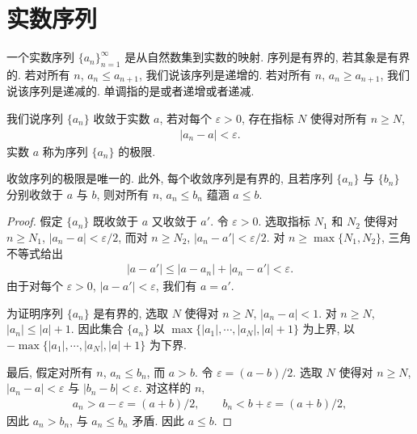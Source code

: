 \documentclass[../../main.tex]{subfiles}
\begin{document}
\section{实数序列}\label{section:ch01-实数序列}

一个实数序列 $\{a_{n}\}_{n=1}^{\infty}$ 是从自然数集到实数的映射. 序列是有界的, 若其象是有界的. 若对所有 $n$, $a_{n}\leqslant a_{n+1}$, 我们说该序列是递增的. 若对所有 $n$, $a_{n}\geqslant a_{n+1}$, 我们说该序列是递减的. 单调指的是或者递增或者递减.

\begin{definition}[收敛]\label{definition:ch01-收敛}
我们说序列 $\{a_{n}\}$ 收敛于实数 $a$, 若对每个 $\varepsilon>0$, 存在指标 $N$ 使得对所有 $n\geqslant N$,
\begin{align*}
|a_{n}-a|<\varepsilon.
\end{align*}
实数 $a$ 称为序列 $\{a_{n}\}$ 的极限.
\end{definition}

\begin{proposition}\label{proposition:ch01-极限性质}
收敛序列的极限是唯一的. 此外, 每个收敛序列是有界的, 且若序列 $\{a_{n}\}$ 与 $\{b_{n}\}$ 分别收敛于 $a$ 与 $b$, 则对所有 $n$, $a_{n}\leqslant b_{n}$ 蕴涵 $a\leqslant b$.
\end{proposition}

\begin{proof}
假定 $\{a_{n}\}$ 既收敛于 $a$ 又收敛于 $a'$. 令 $\varepsilon>0$. 选取指标 $N_{1}$ 和 $N_{2}$ 使得对 $n\geqslant N_{1}$, $|a_{n}-a|<\varepsilon/2$, 而对 $n\geqslant N_{2}$, $|a_{n}-a'|<\varepsilon/2$. 对 $n\geqslant\max\{N_{1},N_{2}\}$, 三角不等式给出
\begin{align*}
|a-a'|\leqslant|a-a_{n}|+|a_{n}-a'|<\varepsilon.
\end{align*}
由于对每个 $\varepsilon>0$, $|a-a'|<\varepsilon$, 我们有 $a=a'$.

为证明序列 $\{a_{n}\}$ 是有界的, 选取 $N$ 使得对 $n\geqslant N$, $|a_{n}-a|<1$. 对 $n\geqslant N$, $|a_{n}|\leqslant|a|+1$. 因此集合 $\{a_{n}\}$ 以 $\max\{|a_{1}|,\cdots,|a_{N}|,|a|+1\}$ 为上界, 以 $-\max\{|a_{1}|,\cdots,|a_{N}|,|a|+1\}$ 为下界.

最后, 假定对所有 $n$, $a_{n}\leqslant b_{n}$, 而 $a>b$. 令 $\varepsilon=(a-b)/2$. 选取 $N$ 使得对 $n\geqslant N$, $|a_{n}-a|<\varepsilon$ 与 $|b_{n}-b|<\varepsilon$. 对这样的 $n$,
\begin{align*}
a_{n}>a-\varepsilon=(a+b)/2,\qquad b_{n}<b+\varepsilon=(a+b)/2,
\end{align*}
因此 $a_{n}>b_{n}$, 与 $a_{n}\leqslant b_{n}$ 矛盾. 因此 $a\leqslant b$.
\end{proof}
\end{document}
